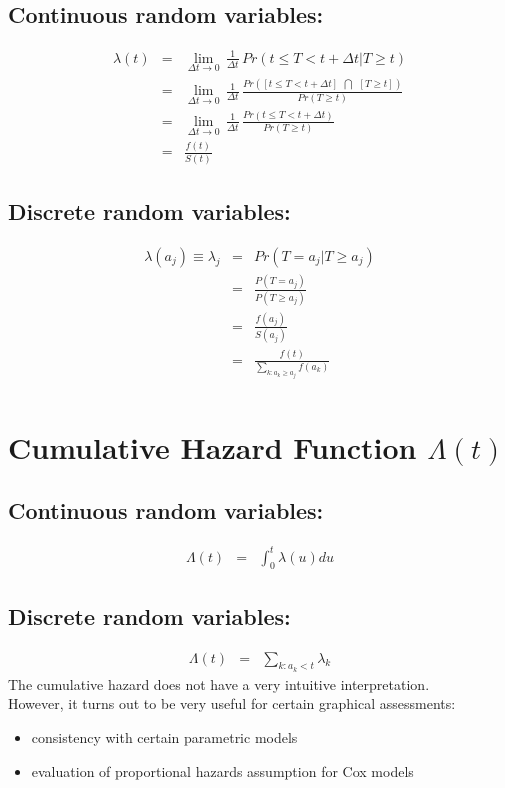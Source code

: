 \documentclass[11pt,slidesonly,semrot,portrait,palatino]{book}
\begin{document}
\subsection{Continuous random variables:}
\begin{eqnarray*}
\lambda(t)  & = &
\lim_{\Delta t \rightarrow 0} \, \frac{1}{\Delta t}\,
Pr(t \le T <  t+\Delta t | T \ge t) \\[2ex]
& = & \lim_{\Delta t \rightarrow 0} \, \frac{1}{\Delta t} \,
\frac{Pr([t \le T <  t+\Delta t] ~~ \bigcap~~ [T \ge t])}
{Pr(T \ge t)}\\[2ex]
& = & \lim_{\Delta t \rightarrow 0} \, \frac{1}{\Delta t} \,
\frac{Pr(t \le T <  t+\Delta t)}{Pr(T \ge t)}\\[2ex]
& = & \frac{f(t)}{S(t)}
\end{eqnarray*}
\subsection{Discrete  random variables:}
   \begin{eqnarray*}
  \lambda(a_j)\equiv \lambda_j   & = &  Pr(T = a_j | T \ge a_j) \\[1ex]
  & = & \frac{P(T=a_j)}{P(T\ge a_j)}\\[1ex]
  & = & \frac{f(a_j)}{S(a_j)}\\[1ex]
  & = & \frac{f(t)}{\sum_{k:a_k\ge a_j}f(a_k)}\\[1ex]
  \end{eqnarray*}
\section{Cumulative Hazard Function $\Lambda(t)$}
\subsection{Continuous random variables:}
\begin{eqnarray*}
\Lambda(t)  & = & \int_0^t \lambda(u) du
\end{eqnarray*}
\subsection{Discrete random variables:}
\begin{eqnarray*}
\Lambda(t) & = &  \sum_{k:a_k<t} \lambda_k
\end{eqnarray*}
The cumulative hazard does not have a very intuitive interpretation.
\\[2ex]
However, it turns out to be very useful for certain graphical
assessments:
\begin{itemize}
\item consistency with certain parametric models
\item evaluation of proportional hazards assumption for Cox models
\end{itemize}
\end{document}
